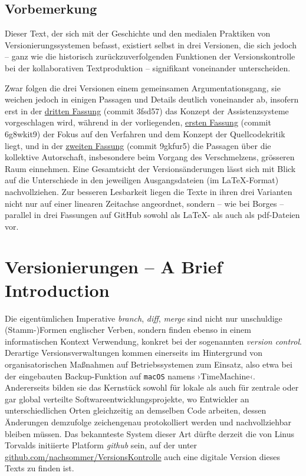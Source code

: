 \documentclass[a4paper,11pt]{article}
\newcommand{\inanf}[1]{›#1‹}
\begin{document}

\subsection*{Vorbemerkung}

Dieser Text, der sich mit der Geschichte und den medialen Praktiken von Versionierungssystemen befasst, existiert selbst in drei Versionen, die sich jedoch – ganz wie die historisch zurückzuverfolgenden Funktionen der Versionskontrolle bei der kollaborativen Textproduktion – signifikant voneinander unterscheiden. 

Zwar folgen die drei Versionen einem gemeinsamen Argumentationsgang, sie weichen jedoch in einigen Passagen und Details deutlich voneinander ab, insofern erst in der \href{https://github.com/nachsommer/VersionsKontrolle/tree/master/3.Fassung}{dritten Fassung} (commit 3fsd57) das Konzept der Assistenzsysteme vorgeschlagen wird, während in der vorliegenden, \href{https://github.com/nachsommer/VersionsKontrolle/tree/master/1.Fassung}{ersten Fassung} (commit 6g8wkit9) der Fokus auf den Verfahren und dem Konzept der Quellcodekritik liegt, und in der \href{https://github.com/nachsommer/VersionsKontrolle/tree/master/2.Fassung}{zweiten Fassung} (commit 9gkfur5) die Passagen über die kollektive Autorschaft, insbesondere beim Vorgang des Verschmelzens, grösseren Raum einnehmen. Eine Gesamtsicht der Versionsänderungen lässt sich mit Blick auf die Unterschiede in den jeweiligen Ausgangsdateien (im \LaTeX-Format) nachvollziehen. Zur besseren Lesbarkeit liegen die Texte in ihren drei Varianten nicht nur auf einer linearen Zeitachse angeordnet, sondern – wie bei Borges – parallel in drei Fassungen auf GitHub sowohl als \LaTeX- als auch als pdf-Dateien vor.

\section{Versionierungen – A Brief Introduction}

Die eigentümlichen Imperative \emph{branch}, \emph{diff}, \emph{merge} sind nicht nur unschuldige (Stamm-)Formen englischer Verben, sondern finden ebenso in einem informatischen Kontext Verwendung, konkret bei der sogenannten \emph{version control}. Derartige Versionsverwaltungen kommen einerseits im Hintergrund von organisatorischen Maßnahmen auf Betriebssystemen zum Einsatz, also etwa bei der eingebauten Backup-Funktion auf \verb+macOS+ namens \inanf{TimeMachine}. Andererseits bilden sie das Kernstück sowohl für lokale als auch für zentrale oder gar global verteilte Softwareentwicklungsprojekte, wo Entwickler an unterschiedlichen Orten gleichzeitig an demselben Code arbeiten, dessen Änderungen demzufolge zeichengenau protokolliert werden und nachvollziehbar bleiben müssen. Das bekannteste System dieser Art dürfte derzeit die von Linus Torvalds initiierte Platform \emph{github} sein, auf der unter \href{https://github.com/nachsommer/VersionsKontrolle}{github.com/nachsommer/VersionsKontrolle} auch eine digitale Version dieses Texts zu finden ist. 
\end{document}
